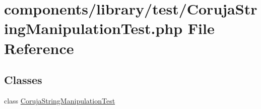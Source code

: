 \hypertarget{_coruja_string_manipulation_test_8php}{
\section{components/library/test/CorujaStringManipulationTest.php File Reference}
\label{_coruja_string_manipulation_test_8php}
}
\subsection*{Classes}
\begin{CompactItemize}
\item 
class \hyperlink{class_coruja_string_manipulation_test}{CorujaStringManipulationTest}
\end{CompactItemize}
